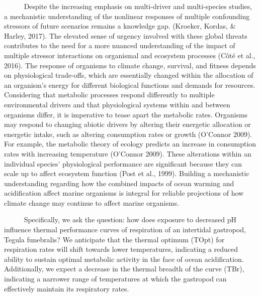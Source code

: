 \documentclass[
]{article}
\begin{document}
~~~~~ Despite the increasing emphasis on multi-driver and multi-species
studies, a mechanistic understanding of the nonlinear responses of
multiple confounding stressors of future scenarios remains a knowledge
gap. (Kroeker, Kordas, \& Harley, 2017). The elevated sense of urgency
involved with these global threats contributes to the need for a more
nuanced understanding of the impact of multiple stressor interactions on
organismal and ecosystem processes (Côté et al., 2016). The response of
organisms to climate change, survival, and fitness depends on
physiological trade-offs, which are essentially changed within the
allocation of an organism's energy for different biological functions
and demands for resources. Considering that metabolic processes respond
differently to multiple environmental drivers and that physiological
systems within and between organisms differ, it is imperative to tease
apart the metabolic rates. Organisms may respond to changing abiotic
drivers by altering their energetic allocation or energetic intake, such
as altering consumption rates or growth (O'Connor 2009). For example,
the metabolic theory of ecology predicts an increase in consumption
rates with increasing temperature (O'Connor 2009). These alterations
within an individual species' physiological performance are significant
because they can scale up to affect ecosystem function (Post et al.,
1999). Building a mechanistic understanding regarding how the combined
impacts of ocean warming and acidification affect marine organisms is
integral for reliable projections of how climate change may continue to
affect marine organisms.

~~~~~ Specifically, we ask the question: how does exposure to decreased
pH influence thermal performance curves of respiration of an intertidal
gastropod, Tegula funebralis? We anticipate that the thermal optimum
(TOpt) for respiration rates will shift towards lower temperatures,
indicating a reduced ability to sustain optimal metabolic activity in
the face of ocean acidification. Additionally, we expect a decrease in
the thermal breadth of the curve (TBr), indicating a narrower range of
temperatures at which the gastropod can effectively maintain its
respiratory rates.
\end{document}
